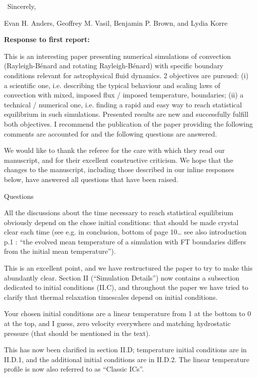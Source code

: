 \documentclass[aps, 11pt, singlecolumn]{revtex4-1} %
\begin{document}
\begin{singlespace}
$\,$\newline
\noindent
Sincerely,

Evan H. Anders, Geoffrey M. Vasil, Benjamin P. Brown, and Lydia Korre



\newpage
\noindent
\Large{\textbf{Response to first report:}}\newline$\,$\newline\indent

\begin{myquotation}
This is an interesting paper presenting numerical simulations of convection (Rayleigh-B\'{e}nard and rotating Rayleigh-B\'{e}nard) with specific boundary conditions relevant for astrophysical fluid dynamics. 
2 objectives are pursued: (i) a scientific one, i.e. describing the typical behaviour and scaling laws of convection with mixed, imposed flux / imposed temperature, boundaries; (ii) a technical / numerical one, i.e. finding a rapid and easy way to reach statistical equilibrium in such simulations. 
Presented results are new and successfully fulfill both objectives. 
I recommend the publication of the paper providing the following comments are accounted for and the following questions are answered.
\end{myquotation}

We would like to thank the referee for the care with which they read our manuscript, and for their excellent constructive criticism.
We hope that the changes to the manuscript, including those described in our inline responses below, have answered all questions that have been raised.


\begin{myquotation}
Questions

All the discussions about the time necessary to reach statistical equilibrium obviously depend on the chose initial conditions: that should be made crystal clear each time (see e.g. in conclusion, bottom of page 10… see also introduction p.1 : ``the evolved mean temperature of a simulation with FT boundaries differs from the initial mean temperature'').
\end{myquotation}
This is an excellent point, and we have restructured the paper to try to make this abundantly clear.
Section II (``Simulation Details'') now contains a subsection dedicated to initial conditions (II.C), and throughout the paper we have tried to clarify that thermal relaxation timescales depend on initial conditions.

\begin{myquotation}
Your chosen initial conditions are a linear temperature from 1 at the bottom to 0 at the top, and I guess, zero velocity everywhere and matching hydrostatic pressure (that should be mentioned in the text). 
\end{myquotation}
This has now been clarified in section II.D; temperature initial conditions are in II.D.1, and the additional initial conditions are in II.D.2.
The linear temperature profile is now also referred to as ``Classic ICs''.


\end{singlespace}
\end{document}
